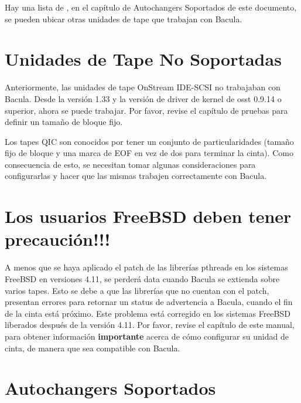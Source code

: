 Hay una lista de ,
en el capítulo de Autochangers Soportados de este documento, se pueden ubicar otras
unidades de tape que trabajan con Bacula.

\section{Unidades de Tape No Soportadas}
\label{DrivesNoSoportados}

Anteriormente, las unidades de tape OnStream IDE-SCSI no trabajaban con Bacula. Desde
la versión 1.33 y la versión de driver de kernel de osst 0.9.14 o superior, ahora
se puede trabajar. Por favor, revise el capítulo de pruebas para definir un tamaño
de bloque fijo.

Los tapes QIC son conocidos por tener un conjunto de particularidades (tamaño fijo
de bloque y una marca de EOF en vez de dos para terminar la cinta). Como consecuencia
de esto, se necesitan tomar algunas consideraciones para configurarlas y hacer que
las mismas trabajen correctamente con Bacula.

\section{Los usuarios FreeBSD deben tener precaución!!!}

A menos que se haya aplicado el patch de las librerías pthreads en los sistemas FreeBSD
en versiones 4.11, se perderá data cuando Bacula se extienda sobre varios tapes.
Esto se debe a que las librerías que no cuentan con el patch, presentan errores para
retornar un status de advertencia a Bacula, cuando el fin de la cinta está próximo.
Este problema está corregido en los sistemas FreeBSD liberados después de la versión
4.11. Por favor, revise el capítulo  de
este manual, para obtener información \textbf{importante} acerca de cómo configurar
su unidad de cinta, de manera que sea compatible con Bacula.

\section{Autochangers Soportados}

